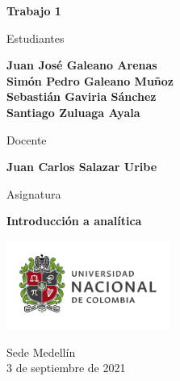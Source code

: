\begin{titlepage}
   \Large{
   \begin{center}
       \vspace*{1cm}

       \textbf{Trabajo 1}

            
       \vspace{1cm}
       
       Estudiantes
       
       \vspace{0.5cm}
        
        
       \textbf{Juan José Galeano Arenas} \\
       \textbf{Simón Pedro Galeano Muñoz} \\
       \textbf{Sebastián Gaviria Sánchez} \\
       \textbf{Santiago Zuluaga Ayala} \\
       
              \vspace{1cm}
       
       Docente
       
       \vspace{0.5cm}

       \textbf{Juan Carlos Salazar Uribe}
       
       \vspace{0.4cm}

       \vspace{1.5cm}
       
       Asignatura
       
       \vspace{0.5cm}

       \textbf{Introducción a analítica}

       \vfill

            
       \vspace{0.1cm}
     
       \includegraphics[width=0.4\textwidth]{logounal.png}
            
       Sede Medellín\\
       3 de septiembre de 2021
       
   \end{center}
   }
\end{titlepage}